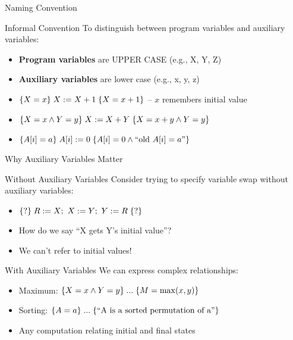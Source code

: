 \begin{frame}{Naming Convention}
    \begin{block}{Informal Convention}
        To distinguish between program variables and auxiliary variables:
        \begin{itemize}
            \item \textbf{Program variables} are UPPER CASE (e.g., X, Y, Z)
            \item \textbf{Auxiliary variables} are lower case (e.g., x, y, z)
        \end{itemize}
    \end{block}
    
    \begin{example}
        \begin{itemize}
            \item $\{X=x\}\; X:=X+1\; \{X=x+1\}$ -- $x$ remembers initial value
            \item $\{X=x \wedge Y=y\}\; X:=X+Y\; \{X=x+y \wedge Y=y\}$
            \item $\{A[i]=a\}\; A[i]:=0\; \{A[i]=0 \wedge \text{``old } A[i] = a\text{''}\}$
        \end{itemize}
    \end{example}
\end{frame}

\begin{frame}{Why Auxiliary Variables Matter}
    \begin{block}{Without Auxiliary Variables}
        Consider trying to specify variable swap without auxiliary variables:
        \begin{itemize}
            \item $\hoare{?}{R:=X;\ X:=Y;\ Y:=R}{?}$
            \item How do we say ``X gets Y's initial value''?
            \item We can't refer to initial values!
        \end{itemize}
    \end{block}
    
    \begin{block}{With Auxiliary Variables}
        We can express complex relationships:
        \begin{itemize}
            \item Maximum: $\{X=x \wedge Y=y\}\; ...\; \{M = \max(x,y)\}$
            \item Sorting: $\{A=a\}\; ...\; \{\text{``A is a sorted permutation of a''}\}$
            \item Any computation relating initial and final states
        \end{itemize}
    \end{block}
\end{frame}

